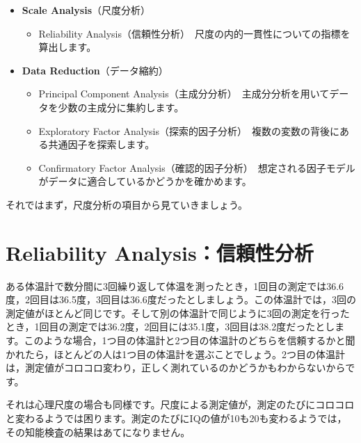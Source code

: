 \documentclass[
  12pt,
  a5jpaper,
  lualatex, ja=standard]{bxjsbook}
\providecommand{\tightlist}{%
  \setlength{\itemsep}{0pt}\setlength{\parskip}{0pt}}
\newenvironment{jmvmenu}{%
	\begin{center}%
	\begin{tcolorbox}[%
		title=分析メニュー,
		colframe=ao,
		colbacktitle=ao,
		colback=ao!2!white,
		breakable,
		width=.9\textwidth,
		]\small\addtolength{\leftmargini}{-3\labelsep}%
	}%
	{\end{tcolorbox}\end{center}}
\begin{document}
\begin{jmvmenu}

\begin{itemize}
\tightlist
\item
  \textbf{Scale Analysis}（尺度分析）

  \begin{itemize}
  \tightlist
  \item
    Reliability Analysis（信頼性分析）　尺度の内的一貫性についての指標を算出します。
  \end{itemize}
\item
  \textbf{Data Reduction}（データ縮約）

  \begin{itemize}
  \tightlist
  \item
    Principal Component Analysis（主成分分析）　主成分分析を用いてデータを少数の主成分に集約します。
  \item
    Exploratory Factor Analysis（探索的因子分析）　複数の変数の背後にある共通因子を探索します。
  \item
    Confirmatory Factor Analysis（確認的因子分析）　想定される因子モデルがデータに適合しているかどうかを確かめます。
  \end{itemize}
\end{itemize}

\end{jmvmenu}

それではまず，尺度分析の項目から見ていきましょう。

\hypertarget{sec:factor-reliability-analysis}{%
\section{Reliability Analysis：信頼性分析}\label{sec:factor-reliability-analysis}}

ある体温計で数分間に3回繰り返して体温を測ったとき，1回目の測定では36.6度，2回目は36.5度，3回目は36.6度だったとしましょう。この体温計では，3回の測定値がほとんど同じです。そして別の体温計で同じように3回の測定を行ったとき，1回目の測定では36.2度，2回目には35.1度，3回目は38.2度だったとします。このような場合，1つ目の体温計と2つ目の体温計のどちらを信頼するかと聞かれたら，ほとんどの人は1つ目の体温計を選ぶことでしょう。2つ目の体温計は，測定値がコロコロ変わり，正しく測れているのかどうかもわからないからです。

それは心理尺度の場合も同様です。尺度による測定値が，測定のたびにコロコロと変わるようでは困ります。測定のたびにIQの値が10も20も変わるようでは，その知能検査の結果はあてになりません。
\end{document}
